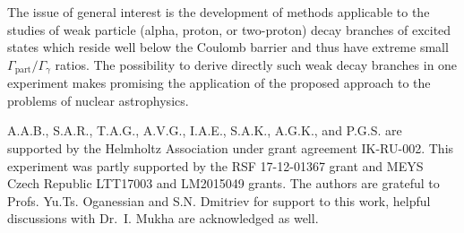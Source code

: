 \documentclass[superscriptaddress,showpacs,showkeys,twoside,floatfix,twocolumn]
{revtex4-1}
\begin{document}
The issue of general interest is the development of methods applicable to
the studies of weak particle (alpha, proton, or two-proton) decay branches
of excited states which reside well below the Coulomb barrier and thus have
extreme small $\Gamma_{\mathrm{part}}/\Gamma_{\gamma}$ ratios.
The possibility to derive directly such weak decay branches in one experiment makes
promising the application of the proposed approach to the problems of nuclear astrophysics.



\begin{acknowledgments}


A.A.B., S.A.R., T.A.G., A.V.G., I.A.E., S.A.K., A.G.K., and P.G.S.
are supported by the Helmholtz Association under grant agreement IK-RU-002.
This experiment was partly supported by the
RSF 17-12-01367 grant and MEYS Czech Republic LTT17003 and LM2015049 grants.
The authors are grateful to Profs. Yu.Ts. Oganessian and S.N. Dmitriev for
support to this work,
helpful discussions with Dr.\ I. Mukha are acknowledged as well.
\end{acknowledgments}




%


\end{document}
